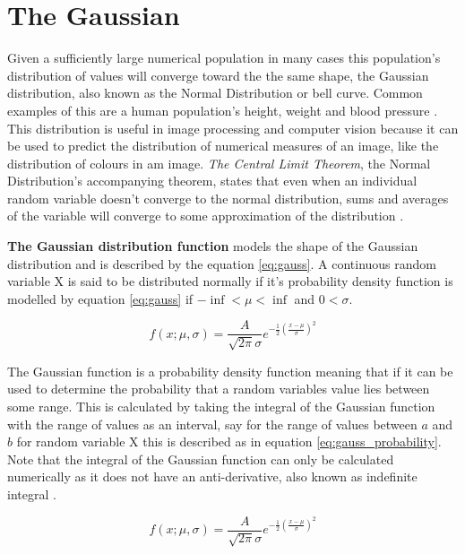 \section{The Gaussian}
\label{section:gaussian}

Given a sufficiently large numerical population in many cases this population's distribution of values will converge toward the the same shape, the Gaussian distribution, also known as the Normal Distribution or bell curve. Common examples of this are a human population's height, weight and blood pressure \cite{modern_statistics}. This distribution is useful in image processing and computer vision because it can be used to predict the distribution of numerical measures of an image, like the distribution of colours in am image. \emph{The Central Limit Theorem}, the Normal Distribution's accompanying theorem, states that even when an individual random variable doesn't converge to the normal distribution, sums and averages of the variable will converge to some approximation of the distribution \cite{modern_statistics}. 

\textbf{The Gaussian distribution function} models the shape of the Gaussian distribution and is described by the equation \ref{eq:gauss}. A continuous random variable X is said to be distributed normally if it's probability density function is modelled by equation \ref{eq:gauss} if $-\inf < \mu < \inf$ and $0 < \sigma$.


\begin{equation}
  f(x; \mu, \sigma) = \frac{A}{\sqrt{2\pi}\sigma}e^{-\frac{1}{2}(\frac{x-\mu}{\sigma})^2}
\label{eq:gauss}
\end{equation}

The Gaussian function is a probability density function meaning that if it can be used to determine the probability that a random variables value lies between some range. This is calculated by taking the integral of the Gaussian function with the range of values as an interval, say for the range of values between $a$ and $b$ for random variable X this is described as in equation \ref{eq:gauss_probability}. Note that the integral of the Gaussian function can only be calculated numerically as it does not have an anti-derivative, also known as indefinite integral \cite{antiderivates}.



\begin{equation}
  f(x; \mu, \sigma) = \frac{A}{\sqrt{2\pi}\sigma}e^{-\frac{1}{2}(\frac{x-\mu}{\sigma})^2}
\label{eq:gauss_probability}
\end{equation}








